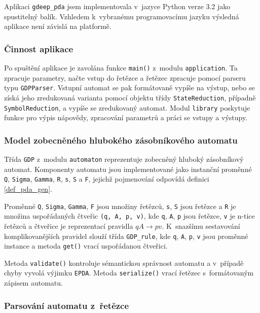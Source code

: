 Aplikaci \texttt{gdeep\_pda} jsem implementovala v~jazyce Python verze 3.2 jako spustitelný balík. Vzhledem k~vybranému programovacímu jazyku výsledná aplikace není závislá na platformě.


\subsubsection{Činnost aplikace}

Po spuštění aplikace je zavolána funkce \texttt{main()} z~modulu \texttt{application}. Ta zpracuje parametry, načte vstup do řetězce a řetězec zpracuje pomocí parseru typu \texttt{GDPParser}. Vstupní automat se pak formátovaně vypíše na výstup, nebo se získá jeho zredukovaná varianta pomocí objektu třídy \texttt{StateReduction}, případně \texttt{SymbolReduction}, a vypíše se zredukovaný automat. Modul \texttt{library} poskytuje funkce pro výpis nápovědy, zpracování parametrů a práci se vstupy a výstupy.


\subsubsection{Model zobecněného hlubokého zásobníkového automatu}

Třída \texttt{GDP} z~modulu \texttt{automaton} reprezentuje zobecněný hluboký zásobníkový automat. Komponenty automatu jsou implementované jako instanční proměnné \texttt{Q}, \texttt{Sigma}, \texttt{Gamma}, \texttt{R}, \texttt{s}, \texttt{S} a \texttt{F}, jejichž pojmenování odpovídá definici \ref{def_pda_gen}. 

Proměnné \texttt{Q}, \texttt{Sigma}, \texttt{Gamma}, \texttt{F} jsou množiny řetězců, \texttt{s}, \texttt{S} jsou řetězce a \texttt{R} je množina uspořádaných čtveřic \texttt{(q, A, p, v)}, kde \texttt{q}, \texttt{A}, \texttt{p} jsou řetězce, \texttt{v} je n-tice řetězců a čtveřice je reprezentací pravidla $qA \rightarrow pv$. 
K~snazšímu sestavování komplikovanějších pravidel slouží třída \texttt{GDP\_rule}, kde \texttt{q}, \texttt{A}, \texttt{p}, \texttt{v} jsou proměnné instance a metoda \texttt{get()} vrací uspořádanou čtveřici.

Metoda \texttt{validate()} kontroluje sémantickou správnost automatu a v~případě chyby vyvolá výjimku \texttt{EPDA}. Metoda \texttt{serialize()} vrací řetězec s~formátovaným zápisem automatu.

\subsubsection{Parsování automatu z~řetězce}

